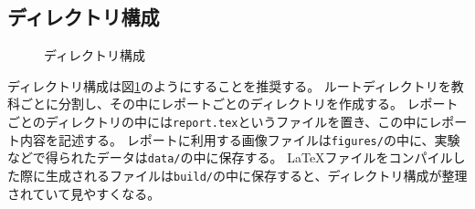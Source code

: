 \subsection{ディレクトリ構成}

\begin{figure}[H]
    \centering
    
    \caption{ディレクトリ構成}
    \label{fig:directory}
\end{figure}

ディレクトリ構成は図\ref{fig:directory}のようにすることを推奨する。
ルートディレクトリを教科ごとに分割し、その中にレポートごとのディレクトリを作成する。
レポートごとのディレクトリの中には\verb|report.tex|というファイルを置き、この中にレポート内容を記述する。
レポートに利用する画像ファイルは\verb|figures/|の中に、実験などで得られたデータは\verb|data/|の中に保存する。
\LaTeX ファイルをコンパイルした際に生成されるファイルは\verb|build/|の中に保存すると、ディレクトリ構成が整理されていて見やすくなる。

